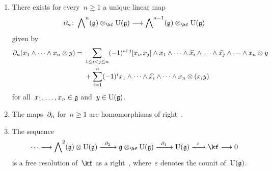 \begin{corollary}
	\label{right koszul is a free resolution}
	\leavevmode
	\begin{enumerate}
		\item
			There exists for every~$n \geq 1$ a unique linear map
			\[
				\del_n
				\colon
				\Exterior^n(\glie) \otimes_{\kf} \Univ(\glie)
				\to
				\Exterior^{n-1}(\glie) \otimes_{\kf} \Univ(\glie)
			\]
			given by
			\begin{align*}
				\partial_n( x_1 \wedge \dotsb \wedge x_n \otimes y )
				={}&
				\sum_{1 \leq i < j \leq n}
				(-1)^{i+j}
				[x_i, x_j] \wedge x_1 \wedge \dotsb \wedge \widehat{x_i} \wedge \dotsb \wedge \widehat{x_j} \wedge \dotsb \wedge x_n
				\otimes y
				\\
				{}&
				+
				\sum_{i=1}^n
				(-1)^i
				x_1 \wedge \dotsb \wedge \widehat{x_i} \wedge \dotsb \wedge x_n \otimes (x_i y)
			\end{align*}
			for all~$x_1, \dotsc, x_n \in \mathfrak{g}$ and~$y \in \operatorname{U}(\mathfrak{g})$.
		\item
			The maps~$\partial_n$ for~$n \geq 1$ are homomorphisms of right~\modules{$\Univ(\glie)$}.
		\item
			The sequence
			\[
				\dotsb
				\to
				\Exterior^2(\glie) \otimes \Univ(\glie)
				\xto{\del_2}
				\glie \otimes_{\kf} \Univ(\glie)
				\xto{\del_1}
				\Univ(\glie)
				\xto{\varepsilon}
				\kf
				\to
				0
			\]
			is a free resolution of~$\kf$ as a right~\module{$\Univ(\glie)$}, where~$\varepsilon$ denotes the counit of~$\Univ(\glie)$.
	\end{enumerate}
\end{corollary}


